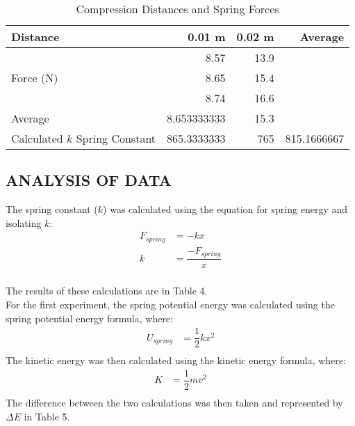 \documentclass [12pt, letterpaper, twoside] {article}
\begin{document}
\begin {table}[h]
  \centering
  \begin {tabular} {| l | r | r | r |}
    \hline\hline
    Distance & 0.01 m & 0.02 m & Average \\
    \hline
    \multirow{3}{*}{Force (N)} & 8.57 & 13.9 & \\
    & 8.65 & 15.4 & \\
    & 8.74 & 16.6 & \\
    \hline
    Average & 8.653333333 & 15.3 & \\
    \hline
    Calculated \(k\) Spring Constant & 865.3333333 & 765 & 815.1666667 \\
    \hline\hline
  \end {tabular}
  \caption {Compression Distances and Spring Forces}
\end {table}

\subsection* {ANALYSIS OF DATA}

The spring constant (\(k\)) was calculated using the equation for spring energy and isolating \(k\):
\begin {equation*}
  \begin {split}
    F_{spring} & = -kx \\
    k & = \dfrac{-F_{spring}}{x} \\
  \end {split}
\end {equation*}

\noindent
The results of these calculations are in Table 4. \\

\noindent
For the first experiment, the spring potential energy was calculated using the spring potential energy formula, where:
\begin {equation*}
  \begin {split}
    U_{spring} & = \dfrac{1}{2}kx^2 \\
  \end {split}
\end {equation*}
The kinetic energy was then calculated using the kinetic energy formula, where:
\begin {equation*}
  \begin {split}
    K & = \dfrac{1}{2}mv^2 \\
  \end {split}
\end {equation*}
The difference between the two calculations was then taken and represented by \(\Delta{E}\) in Table 5. \\
\end{document}
